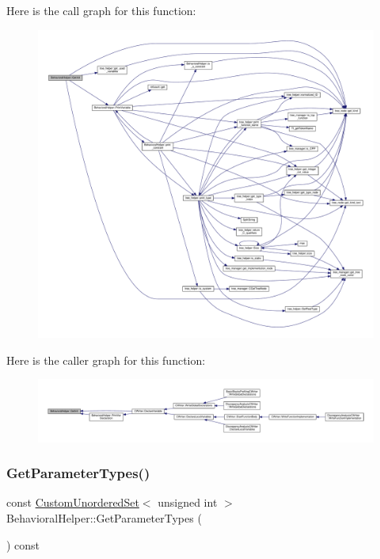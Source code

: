 Here is the call graph for this function\+:
\nopagebreak
\begin{figure}[H]
\begin{center}
\leavevmode
\includegraphics[width=350pt]{dd/db2/classBehavioralHelper_a60ede8d00944093fe896d3d24c4f3426_cgraph}
\end{center}
\end{figure}
Here is the caller graph for this function\+:
\nopagebreak
\begin{figure}[H]
\begin{center}
\leavevmode
\includegraphics[width=350pt]{dd/db2/classBehavioralHelper_a60ede8d00944093fe896d3d24c4f3426_icgraph}
\end{center}
\end{figure}
\mbox{\label{classBehavioralHelper_a8f8fdd077000ffb5326af5d5bad2c664}} 
\subsubsection{\texorpdfstring{Get\+Parameter\+Types()}{GetParameterTypes()}}
{\footnotesize\ttfamily const \hyperlink{classCustomUnorderedSet}{Custom\+Unordered\+Set}$<$ unsigned int $>$ Behavioral\+Helper\+::\+Get\+Parameter\+Types (\begin{DoxyParamCaption}{ }\end{DoxyParamCaption}) const\hspace{0.3cm}{\ttfamily [virtual]}}



